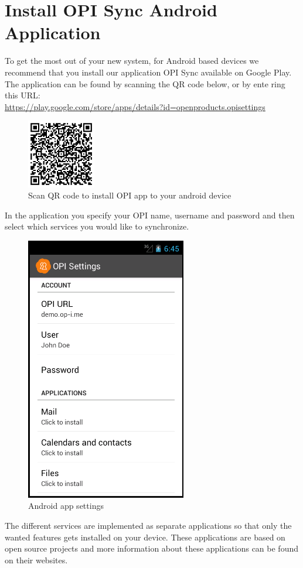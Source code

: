 \documentclass[12pt,a4paper,titlepage]{article}
\begin{document}
\section{Install OPI Sync Android Application}
To get the most out of your new system, for Android based devices we recommend that you install our application OPI Sync available on Google Play.
The application can be found by scanning the QR code below, or by ente
ring this URL: \\
\href{https://play.google.com/store/apps/details?id=openproducts.opisettings}{https://play.google.com/store/apps/details?id=openproducts.opisettings}
\begin{figure}[h]
\centering
\includegraphics[width=3cm]{./img/qr-code-opi-settings}
\caption{Scan QR code to install OPI app to your android device}
\end{figure}
In the application you specify your OPI name, username and password and then select which services you would like to synchronize.
\begin{figure}[h]
\centering
\includegraphics[width=7cm]{./img/opi-settings}
\caption{Android app settings}
\end{figure}
The different services are implemented as separate applications so that only the wanted features gets installed on your device.
These applications are based on open source projects and more information about these applications can be found on their websites.
\end{document}
